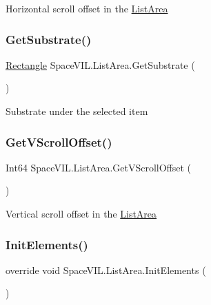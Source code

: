Horizontal scroll offset in the \mbox{\hyperlink{class_space_v_i_l_1_1_list_area}{List\+Area}} 

\mbox{\label{class_space_v_i_l_1_1_list_area_a204ed17573d7651514702422b51f1389}} 
\subsubsection{\texorpdfstring{Get\+Substrate()}{GetSubstrate()}}
{\footnotesize\ttfamily \mbox{\hyperlink{class_space_v_i_l_1_1_rectangle}{Rectangle}} Space\+V\+I\+L.\+List\+Area.\+Get\+Substrate (\begin{DoxyParamCaption}{ }\end{DoxyParamCaption})}



Substrate under the selected item 

\mbox{\label{class_space_v_i_l_1_1_list_area_aa7af82dde87cb38962fcf14378ebe39f}} 
\subsubsection{\texorpdfstring{Get\+V\+Scroll\+Offset()}{GetVScrollOffset()}}
{\footnotesize\ttfamily Int64 Space\+V\+I\+L.\+List\+Area.\+Get\+V\+Scroll\+Offset (\begin{DoxyParamCaption}{ }\end{DoxyParamCaption})}



Vertical scroll offset in the \mbox{\hyperlink{class_space_v_i_l_1_1_list_area}{List\+Area}} 

\mbox{\label{class_space_v_i_l_1_1_list_area_ac60446e61da68f5a73ef6981ac26c9a3}} 
\subsubsection{\texorpdfstring{Init\+Elements()}{InitElements()}}
{\footnotesize\ttfamily override void Space\+V\+I\+L.\+List\+Area.\+Init\+Elements (\begin{DoxyParamCaption}{ }\end{DoxyParamCaption})\hspace{0.3cm}{\ttfamily [virtual]}}



